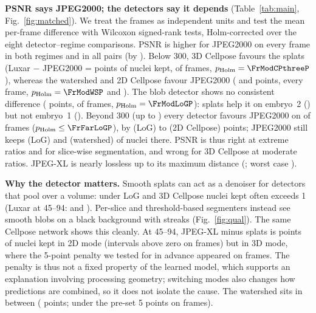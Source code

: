 \documentclass[conference]{IEEEtran}
\begin{document}
\textbf{PSNR says JPEG2000; the detectors say it depends} (Table~\ref{tab:main},
Fig.~\ref{fig:matched}). We treat the \FrN{} frames as independent units and test the mean
per-frame difference with Wilcoxon signed-rank tests, Holm-corrected over the eight
detector--regime comparisons. PSNR is higher for JPEG2000 on every frame in both regimes
and in all \PSNRjtkWins{} pairs (by \DPSNR). Below \SI{300}{\times}, 3D Cellpose favours the
splats (Luxar $-$ JPEG2000 = \FrModCPthree{} points of nuclei kept, \FrModCPthreePos{} of
\FrN{} frames, $p_\mathrm{Holm}=\FrModCPthreeP$), whereas the watershed and 2D Cellpose favour
JPEG2000 (\FrModWS{} and \FrModCP{} points, every frame, $p_\mathrm{Holm}=\FrModWSP$ and
\FrModCPP). The blob detector shows no consistent difference (\FrModLoG{} points,
\FrModLoGPos{} of \FrN{} frames, $p_\mathrm{Holm}=\FrModLoGP$): splats help it on embryo~2
(\FrModLoGETwo) but not embryo~1 (\FrModLoGEOne). Beyond \SI{300}{\times} (up to
\JtkMaxRatio) every detector favours JPEG2000 on \FrFarNeg{} of \FrN{} frames
($p_\mathrm{Holm}\le\FrFarLoGP$), by \FrFarLoG{} (LoG) to \FrFarCP{} (2D Cellpose) points;
JPEG2000 still keeps \FarJtkLoG{} (LoG) and \FarJtkWS{} (watershed) of nuclei there. PSNR is
thus right at extreme ratios and for slice-wise segmentation, and wrong for 3D Cellpose at
moderate ratios. JPEG-XL is nearly lossless up to its maximum distance (\JXLmax; worst case
\JXLworst).

\begin{table}[t]
\centering
\caption{Luxar minus JPEG2000 at identical bytes, frame level: mean over \FrN{} frames of the
per-frame mean difference (nuclei kept in points; PSNR in dB), 95\% cluster-bootstrap interval
over frames, and frames favouring Luxar\,:\,JPEG2000. Bold: Holm-corrected Wilcoxon
$p<0.05$.}
\label{tab:main}
\setlength{\tabcolsep}{3pt}
\resizebox{\columnwidth}{!}{}
\end{table}

\textbf{Why the detector matters.} Smooth splats can act as a denoiser for detectors that pool
over a volume: under LoG and 3D Cellpose nuclei kept often exceeds 1 (Luxar at
\SIrange{45}{94}{\times}: \LuxMidLoG{} and \LuxMidCPthree). Per-slice and threshold-based
segmenters instead see smooth blobs on a black background with streaks (Fig.~\ref{fig:qual}).
The same Cellpose network shows this cleanly. At \SIrange{45}{94}{\times}, JPEG-XL minus
splats is \GapCP{} points of nuclei kept in 2D mode (intervals above zero on \GapCIfrac{}
frames) but \GapCPthree{} in 3D mode, where the 5-point penalty we tested for in advance
appeared on \RuleGapBigCPthree{} frames. The penalty is thus not a fixed property of the learned
model, which supports an explanation involving processing geometry; switching modes also
changes how predictions are combined, so it does not isolate the cause. The watershed sits in between (\GapWS{} points; under the pre-set 5 points
on \RuleGapSmallWS{} frames).
\end{document}
